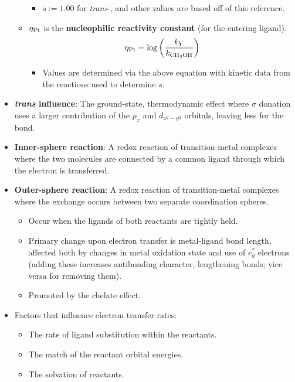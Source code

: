 \documentclass[../notes.tex]{subfiles}
\begin{document}
\begin{itemize}
\begin{itemize}
\begin{itemize}
            \item $s:=1.00$ for \emph{trans}-\ce{[Pt(py)2Cl2]}, and other values are based off of this reference.
        \end{itemize}
        \item $\eta_{\ce{Pt}}$ is the \textbf{nucleophilic reactivity constant} (for the entering ligand).
        \begin{equation*}
            \eta_{\ce{Pt}} = \log\left( \frac{k_Y}{k_{\ce{CH3OH}}} \right)
        \end{equation*}
        \begin{itemize}
            \item Values are determined via the above equation with kinetic data from the reactions used to determine $s$.
        \end{itemize}
    \end{itemize}
    \item \textbf{\emph{trans} influence}: The ground-state, thermodynamic effect where  $\sigma$ donation uses a larger contribution of the $p_x$ and $d_{x^2-y^2}$ orbitals, leaving less for the  bond.
    \item \textbf{Inner-sphere reaction}: A redox reaction of transition-metal complexes where the two molecules are connected by a common ligand through which the electron is transferred.
    \item \textbf{Outer-sphere reaction}: A redox reaction of transition-metal complexes where the exchange occurs between two separate coordination spheres.
    \begin{itemize}
        \item Occur when the ligands of both reactants are tightly held.
        \item Primary change upon electron transfer is metal-ligand bond length, affected both by changes in metal oxidation state and use of $e_g^*$ electrons (adding these increases antibonding character, lengthening bonds; vice versa for removing them).
        \item Promoted by the chelate effect.
    \end{itemize}
    \item Factors that influence electron transfer rates:
    \begin{itemize}
        \item The rate of ligand substitution within the reactants.
        \item The match of the reactant orbital energies.
        \item The solvation of reactants.

\end{itemize}
\end{itemize}
\end{document}
